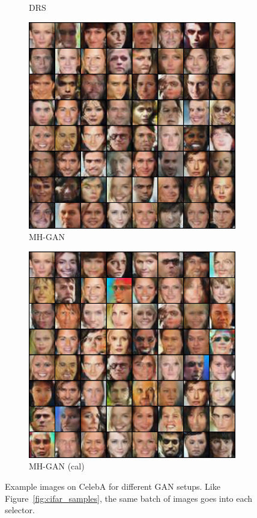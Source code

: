 \begin{figure}[htbp]
\begin{subfigure}[b]{0.49\textwidth}
       \caption{DRS}
    \end{subfigure}
    \begin{subfigure}[b]{0.49\textwidth}
       \centering
       \includegraphics[width=\exfactor\textwidth]{figures/celeba/31_base_raw_MH.png}
       \caption{MH-GAN}
    \end{subfigure}
    \begin{subfigure}[b]{0.49\textwidth}
       \centering
       \includegraphics[width=\exfactor\textwidth]{figures/celeba/31_base_iso_MH.png}
       \caption{MH-GAN (cal)}
    \end{subfigure}
    \caption{
    Example images on CelebA for different GAN setups.
    Like Figure~\ref{fig:cifar_samples}, the same batch of images goes into each selector.
    }
    \label{fig:celeba_samples}
\end{figure}
